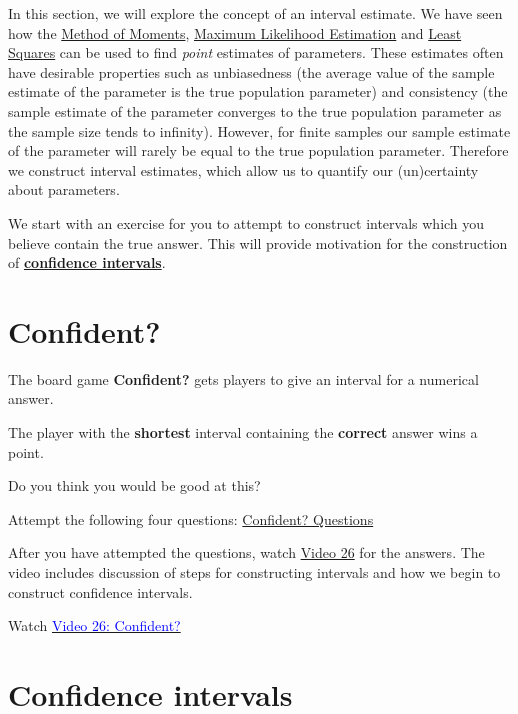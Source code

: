 \documentclass[
]{book}
\begin{document}
In this section, we will explore the concept of an interval estimate. We have seen how the \protect\hyperlink{MLE:moments}{Method of Moments}, \protect\hyperlink{MLE:MLE}{Maximum Likelihood Estimation} and \protect\hyperlink{Sec_LinearI:line}{Least Squares} can be used to find \emph{point} estimates of parameters. These estimates often have desirable properties such as unbiasedness (the average value of the sample estimate of the parameter is the true population parameter) and consistency (the sample estimate of the parameter converges to the true population parameter as the sample size tends to infinity). However, for finite samples our sample estimate of the parameter will rarely be equal to the true population parameter. Therefore we construct interval estimates, which allow us to quantify our (un)certainty about parameters.

We start with an exercise for you to attempt to construct intervals which you believe contain the true answer. This will provide motivation for the construction of \protect\hyperlink{Interval_Estimation:CI}{\textbf{confidence intervals}}.

\hypertarget{Interval_Estimation:confident}{%
\section{Confident?}\label{Interval_Estimation:confident}}

The board game \textbf{Confident?} gets players to give an interval for a numerical answer.

The player with the \textbf{shortest} interval containing the \textbf{correct} answer wins a point.

Do you think you would be good at this?

Attempt the following four questions: \href{https://forms.office.com/r/LckVnbns6s}{Confident? Questions}

After you have attempted the questions, watch \protect\hyperlink{video26}{Video 26} for the answers. The video includes discussion of steps for constructing intervals and how we begin to construct confidence intervals.

Watch \href{https://mediaspace.nottingham.ac.uk/media/Confident+FINAL+VERSION/1_19m8fvez}{\textcolor{blue}{Video 26: Confident?}}

\hypertarget{Interval_Estimation:CI}{%
\section{Confidence intervals}\label{Interval_Estimation:CI}}
\end{document}
